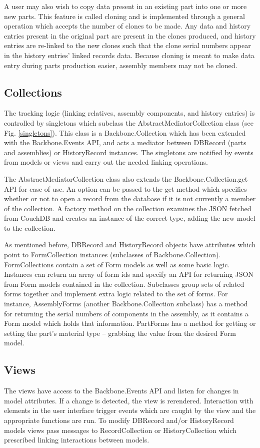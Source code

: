 \documentclass[journal]{IEEEtran}
\begin{document}
A user may also wish to copy data present in an existing part into one or more new parts. This
feature is called cloning and is implemented through a general operation which accepts the number
of clones to be made. Any data and history entries present in the original part are present in the
clones produced, and history entries are re-linked to the new clones such that the clone serial
numbers appear in the history entries' linked records data. Because cloning is meant to make
data entry during parts production easier, assembly members may not be cloned. 

\subsection{Collections}
The tracking logic (linking relatives, assembly components, and history entries) is controlled
by singletons which subclass the AbstractMediatorCollection class (see Fig. \ref{singletons}). This class is a Backbone.Collection
which has been extended with the Backbone.Events API, and acts a mediator between DBRecord (parts and assemblies) or
HistoryRecord instances. The singletons are notified by events from models or views and carry out the needed
linking operations.

The AbstractMediatorCollection class also extends the
Backbone.Collection.get API for ease of use. An option can be passed to the get method which
specifies whether or not to open a record from the database if it is not currently a member
of the collection.
A factory method on the collection examines the JSON
fetched from CouchDB and creates an instance of the correct type, adding the new model
to the collection. 

As mentioned before, DBRecord and HistoryRecord objects have attributes which point to FormCollection instances (subclasses
of Backbone.Collection).
FormCollections contain a set of Form models as well as some basic logic. Instances can return an array of form ids
and specify an API for returning JSON from Form models contained in the collection. Subclasses 
group sets of related forms together and implement extra logic related to the set of forms. For instance, AssemblyForms (another Backbone.Collection
subclass)
has a method for returning the serial numbers of components in the assembly, as it contains a Form model which holds
that information. PartForms has a method for getting or setting the part's material type -- grabbing the value from the
desired Form model.

\subsection{Views}
The views have access to the Backbone.Events API and listen for changes in model attributes. If a change is detected,
the view is rerendered. Interaction with elements in the user interface trigger events which are caught by the view and the appropriate
functions are run. To modify DBRecord and/or HistoryRecord models views pass messages to 
RecordCollection or HistoryCollection which prescribed linking interactions between models.
\end{document}
